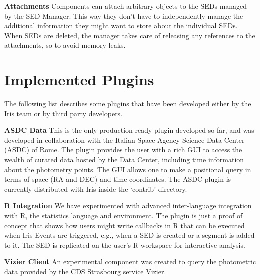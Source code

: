 \textbf{Attachments}
Components can attach arbitrary objects to the SEDs managed by the SED Manager. This way they don't have to independently manage the additional information they might want to store about the individual SEDs. When SEDs are deleted, the manager takes care of releasing any references to the attachments, so to avoid memory leaks.

\section{Implemented Plugins}
The following list describes some plugins that have been developed either by the Iris team or by third party developers.

\textbf{ASDC Data}
This is the only production-ready plugin developed so far, and was developed in collaboration with the Italian Space Agency Science Data Center (ASDC) of Rome. The plugin provides the user with a rich GUI to access the wealth of curated data hosted by the Data Center, including time information about the photometry points. The GUI allows one to make a positional query in terms of space (RA and DEC) and time coordinates. The ASDC plugin is currently distributed with Iris inside the `contrib' directory.

\textbf{R Integration}
We have experimented with advanced inter-language integration with R, the statistics language and environment. The plugin is just a proof of concept that shows how users might write callbacks in R that can be executed when Iris Events are triggered, e.g., when a SED is created or a segment is added to it. The SED is replicated on the user's R workspace for interactive analysis.

\textbf{Vizier Client}
An experimental component was created to query the photometric data provided by the CDS Strasbourg service Vizier.

